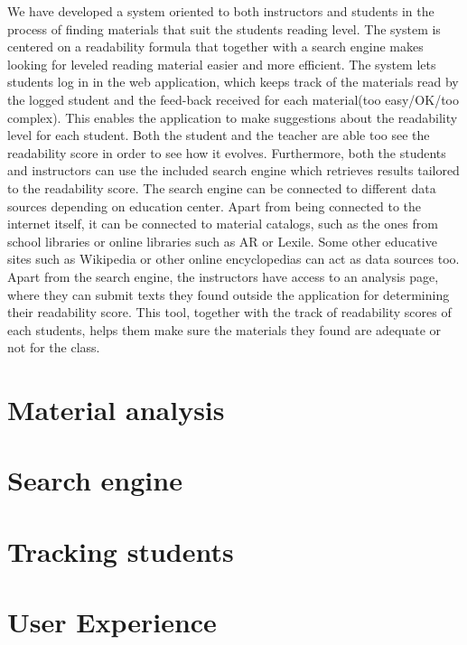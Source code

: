 \documentclass{sig-alternate-05-2015}
\begin{document}
{We have developed a system oriented to both instructors and students in the process of finding materials that suit the students reading level. The system is centered on a readability formula that together with a search engine makes looking for leveled reading material easier and more efficient. The system lets students log in in the web application, which keeps track of the materials read by the logged student and the feed-back received for each material(too easy/OK/too complex). This enables the application to make suggestions about the readability level for each student. Both the student and the teacher are able too see the readability score in order to see how it evolves. Furthermore, both the students and instructors can use the included search engine which retrieves results tailored to the readability score. The search engine can be connected to different data sources depending on education center. Apart from being connected to the internet itself, it can be connected to material catalogs, such as the ones from school libraries or online libraries such as AR or Lexile. Some other educative sites such as Wikipedia or other online encyclopedias can act as data sources too. \\

Apart from the search engine, the instructors have access to an analysis page, where they can submit texts they found outside the application for determining their readability score. This tool, together with the track of readability scores of each students, helps them make sure the materials they found are adequate or not for the class.




\section{Material analysis}


\section{Search engine}


\section{Tracking students}

\section{User Experience}

}
\end{document}
